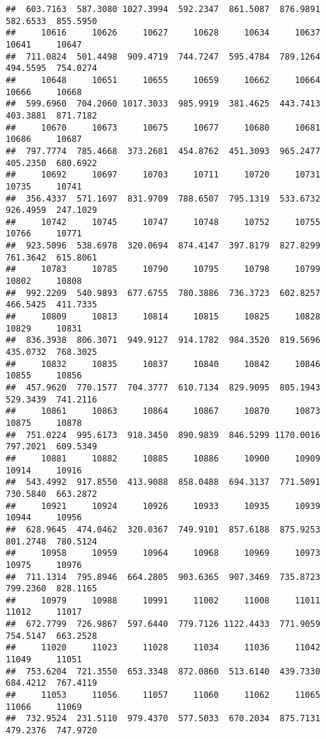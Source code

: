 \documentclass[
]{article}
\begin{document}
\begin{verbatim}
##  603.7163  587.3080 1027.3994  592.2347  861.5087  876.9891  582.6533  855.5950 
##     10616     10626     10627     10628     10634     10637     10641     10647 
##  711.0824  501.4498  909.4719  744.7247  595.4784  789.1264  494.5595  754.0274 
##     10648     10651     10655     10659     10662     10664     10666     10668 
##  599.6960  704.2060 1017.3033  985.9919  381.4625  443.7413  403.3881  871.7182 
##     10670     10673     10675     10677     10680     10681     10686     10687 
##  797.7774  785.4668  373.2681  454.8762  451.3093  965.2477  405.2350  680.6922 
##     10692     10697     10703     10711     10720     10731     10735     10741 
##  356.4337  571.1697  831.9709  788.6507  795.1319  533.6732  926.4959  247.1029 
##     10742     10745     10747     10748     10752     10755     10766     10771 
##  923.5096  538.6978  320.0694  874.4147  397.8179  827.8299  761.3642  615.8061 
##     10783     10785     10790     10795     10798     10799     10802     10808 
##  992.2209  540.9893  677.6755  780.3886  736.3723  602.8257  466.5425  411.7335 
##     10809     10813     10814     10815     10825     10828     10829     10831 
##  836.3938  806.3071  949.9127  914.1782  984.3520  819.5696  435.0732  768.3025 
##     10832     10835     10837     10840     10842     10846     10855     10856 
##  457.9620  770.1577  704.3777  610.7134  829.9095  805.1943  529.3439  741.2116 
##     10861     10863     10864     10867     10870     10873     10875     10878 
##  751.0224  995.6173  918.3450  890.9839  846.5299 1170.0016  797.2021  609.5349 
##     10881     10882     10885     10886     10900     10909     10914     10916 
##  543.4992  917.8550  413.9088  858.0488  694.3137  771.5091  730.5840  663.2872 
##     10921     10924     10926     10933     10935     10939     10944     10956 
##  628.9645  474.0462  320.0367  749.9101  857.6188  875.9253  801.2748  780.5124 
##     10958     10959     10964     10968     10969     10973     10975     10976 
##  711.1314  795.8946  664.2805  903.6365  907.3469  735.8723  799.2360  828.1165 
##     10979     10988     10991     11002     11008     11011     11012     11017 
##  672.7799  726.9867  597.6440  779.7126 1122.4433  771.9059  754.5147  663.2528 
##     11020     11023     11028     11034     11036     11042     11049     11051 
##  753.6204  721.3550  653.3348  872.0860  513.6140  439.7330  684.4212  767.4119 
##     11053     11056     11057     11060     11062     11065     11066     11069 
##  732.9524  231.5110  979.4370  577.5033  670.2034  875.7131  479.2376  747.9720 

\end{verbatim}
\end{document}
